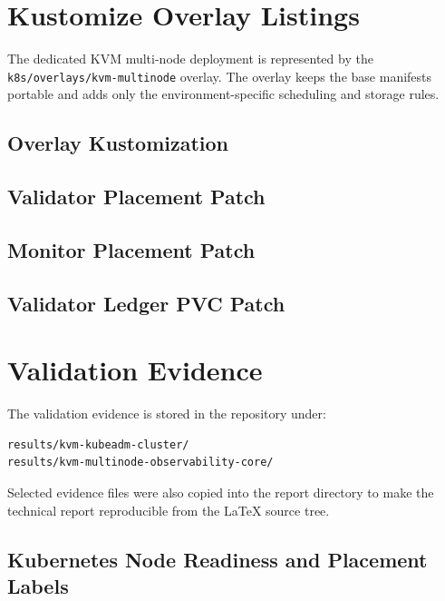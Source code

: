 \documentclass[11pt,a4paper]{article}
\begin{document}
\section{Kustomize Overlay Listings}

The dedicated KVM multi-node deployment is represented by the \texttt{k8s/overlays/kvm-multinode} overlay. The overlay keeps the base manifests portable and adds only the environment-specific scheduling and storage rules.

\subsection{Overlay Kustomization}



\subsection{Validator Placement Patch}



\subsection{Monitor Placement Patch}



\subsection{Validator Ledger PVC Patch}



\section{Validation Evidence}

The validation evidence is stored in the repository under:

\begin{lstlisting}
results/kvm-kubeadm-cluster/
results/kvm-multinode-observability-core/
\end{lstlisting}

Selected evidence files were also copied into the report directory to make the technical report reproducible from the LaTeX source tree.

\subsection{Kubernetes Node Readiness and Placement Labels}
\end{document}
